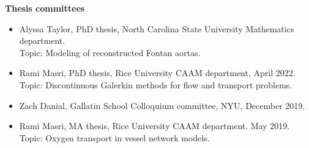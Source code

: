 \documentclass{article} %
\begin{document}

\vspace{0.5cm}
\noindent
{\bf \large Thesis committees}
\begin{itemize}
\item Alyssa Taylor, PhD thesis, North Carolina State University Mathematics department. \\
Topic: Modeling of reconstructed Fontan aortas.
\item Rami Masri, PhD thesis, Rice University CAAM department, April 2022. \\
Topic: Discontinuous Galerkin methods for flow and transport problems.
\item Zach Danial, Gallatin School Colloquium committee, NYU, December 2019.
\item Rami Masri, MA thesis, Rice University CAAM department. May 2019. \\
Topic: Oxygen transport in vessel network models.
\end{itemize}
\end{document}
